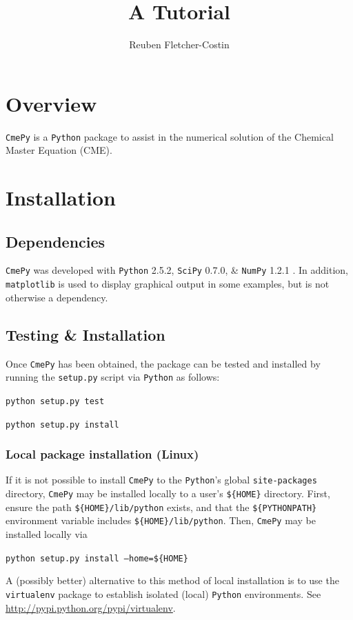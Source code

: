 \documentclass{article}
\title{A \cmepy{} Tutorial}
\author{Reuben Fletcher-Costin}
\newcommand{\mono}[1]{\texttt{#1}}
\newcommand{\cmepy}{\mono{CmePy}}
\newcommand{\python}{\mono{Python}}
\newcommand{\numpy}{\mono{NumPy}}
\newcommand{\scipy}{\mono{SciPy}}
\newcommand{\matplotlib}{\mono{matplotlib}}
\begin{document}
\maketitle

\tableofcontents

\section{Overview}

\cmepy{} is a \python{} package to assist in the numerical solution of the
Chemical Master Equation (CME).

\section{Installation}

\subsection{Dependencies}
\cmepy{} was developed with \python{} 2.5.2, \scipy{} 0.7.0, \& \numpy{} 1.2.1 .
In addition, \matplotlib{} is used to display graphical output in some
examples, but is not otherwise a dependency.

\subsection{Testing \& Installation}

Once \cmepy{} has been obtained, the package can be tested and installed
by running the \mono{setup.py} script via \python{} as follows:

\mono{python setup.py test}

\mono{python setup.py install}

\subsubsection{Local package installation (Linux)}
If it is not possible to install \cmepy{} to the \python{}'s global
\mono{site-packages} directory, \cmepy{} may be installed locally to a user's
\mono{\$\{HOME\}} directory. First, ensure the path
\mono{\$\{HOME\}/lib/python} exists,
and that the \mono{\$\{PYTHONPATH\}}
environment variable includes
\mono{\$\{HOME\}/lib/python}. Then, \cmepy{} may be installed locally via

\mono{python setup.py install --home=\$\{HOME\}}

A (possibly better) alternative to this method of local installation is to
use the \mono{virtualenv} package to establish isolated (local)
\python{} environments. See \url{http://pypi.python.org/pypi/virtualenv}.
\end{document}
